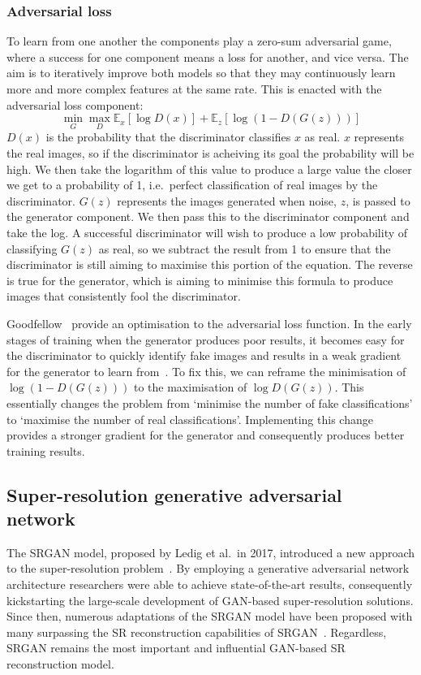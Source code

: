 \subsubsection{Adversarial loss}
To learn from one another the components play a zero-sum adversarial game, where a success for one component means a loss for another, and vice versa. The aim is to iteratively improve both models so that they may continuously learn more and more complex features at the same rate. This is enacted with the adversarial loss component:
\[\min_G\max_D\mathbb{E}_x[\log D(x)] + \mathbb{E}_z[\log(1 - D(G(z)))]\]
$D(x)$ is the probability that the discriminator classifies $x$ as real. $x$ represents the real images, so if the discriminator is acheiving its goal the probability will be high. We then take the logarithm of this value to produce a large value the closer we get to a probability of 1, i.e.\ perfect classification of real images by the discriminator. $G(z)$ represents the images generated when noise, $z$, is passed to the generator component. We then pass this to the discriminator component and take the log. A successful discriminator will wish to produce a low probability of classifying $G(z)$ as real, so we subtract the result from 1 to ensure that the discriminator is still aiming to maximise this portion of the equation. The reverse is true for the generator, which is aiming to minimise this formula to produce images that consistently fool the discriminator.

Goodfellow \etal \ provide an optimisation to the adversarial loss function. In the early stages of training when the generator produces poor results, it becomes easy for the discriminator to quickly identify fake images and results in a weak gradient for the generator to learn from~\cite{gan}. To fix this, we can reframe the minimisation of $\log(1 - D(G(z)))$ to the maximisation of $\log D(G(z))$. This essentially changes the problem from `minimise the number of fake classifications' to `maximise the number of real classifications'. Implementing this change provides a stronger gradient for the generator and consequently produces better training results.

\subsection{Super-resolution generative adversarial network}
The SRGAN model, proposed by Ledig et al.\ in 2017, introduced a new approach to the super-resolution problem~\cite{srgan}. By employing a generative adversarial network architecture researchers were able to achieve state-of-the-art results, consequently kickstarting the large-scale development of GAN-based super-resolution solutions. Since then, numerous adaptations of the SRGAN model have been proposed with many surpassing the SR reconstruction capabilities of SRGAN~\cite{models}. Regardless, SRGAN remains the most important and influential GAN-based SR reconstruction model.

